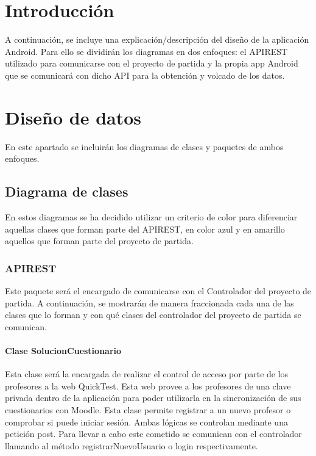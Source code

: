 
\section{Introducción}

A continuación, se incluye una explicación/descripción del diseño de la aplicación Android. Para ello se dividirán los diagramas en dos enfoques: el APIREST utilizado para comunicarse con el proyecto de partida y la propia app Android que se comunicará con dicho API para la obtención y volcado de los datos.

\section{Diseño de datos}

En este apartado se incluirán los diagramas de clases y paquetes de ambos enfoques.

\subsection{Diagrama de clases}

En estos diagramas se ha decidido utilizar un criterio de color para diferenciar aquellas clases que forman parte del APIREST, en color azul y en amarillo aquellos que forman parte del proyecto de partida.

\subsubsection{APIREST}

Este paquete será el encargado de comunicarse con el Controlador del proyecto de partida. A continuación, se mostrarán de manera fraccionada cada una de las clases que lo forman y con qué clases del controlador del proyecto de partida se comunican.

\paragraph{Clase SolucionCuestionario}

Esta clase será la encargada de realizar el control de acceso por parte de los profesores a la web QuickTest. Esta web provee a los profesores de una clave privada dentro de la aplicación para poder utilizarla en la sincronización de sus cuestionarios con Moodle. Esta clase permite registrar a un nuevo profesor o comprobar si puede iniciar sesión. Ambas lógicas se controlan mediante una petición post. Para llevar a cabo este cometido se comunican con el controlador llamando al método registrarNuevoUsuario o login respectivamente.

